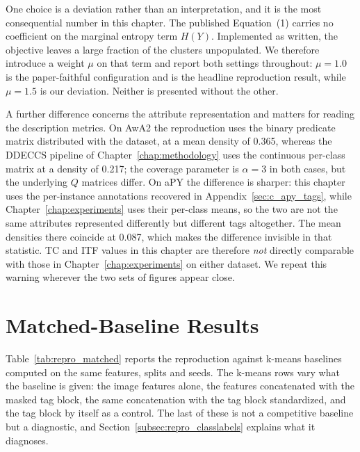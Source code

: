 One choice is a deviation rather than an interpretation, and it is the most consequential number in this chapter. The published Equation~(1) carries no coefficient on the marginal entropy term $H(Y)$. Implemented as written, the objective leaves a large fraction of the clusters unpopulated. We therefore introduce a weight $\mu$ on that term and report both settings throughout: $\mu = 1.0$ is the paper-faithful configuration and is the headline reproduction result, while $\mu = 1.5$ is our deviation. Neither is presented without the other.

A further difference concerns the attribute representation and matters for reading the description metrics. On AwA2 the reproduction uses the binary predicate matrix distributed with the dataset, at a mean density of 0.365, whereas the DDECCS pipeline of Chapter~\ref{chap:methodology} uses the continuous per-class matrix at a density of 0.217; the coverage parameter is $\alpha = 3$ in both cases, but the underlying $Q$ matrices differ. On aPY the difference is sharper: this chapter uses the per-instance annotations recovered in Appendix~\ref{sec:c_apy_tags}, while Chapter~\ref{chap:experiments} uses their per-class means, so the two are not the same attributes represented differently but different tags altogether. The mean densities there coincide at 0.087, which makes the difference invisible in that statistic. TC and ITF values in this chapter are therefore \emph{not} directly comparable with those in Chapter~\ref{chap:experiments} on either dataset. We repeat this warning wherever the two sets of figures appear close.

\section{Matched-Baseline Results}
\label{sec:repro_matched}

Table~\ref{tab:repro_matched} reports the reproduction against k-means baselines computed on the same features, splits and seeds. The k-means rows vary what the baseline is given: the image features alone, the features concatenated with the masked tag block, the same concatenation with the tag block standardized, and the tag block by itself as a control. The last of these is not a competitive baseline but a diagnostic, and Section~\ref{subsec:repro_classlabels} explains what it diagnoses.

